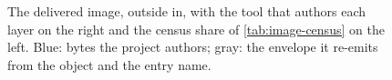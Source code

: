 \begin{figure}[htbp]
\caption{The delivered image, outside in, with the tool that authors each layer on the right and the census
share of \cref{tab:image-census} on the left. Blue: bytes the project authors; gray: the envelope it
re-emits from the object and the entry name.}
\label{fig:image-container}
\end{figure}
